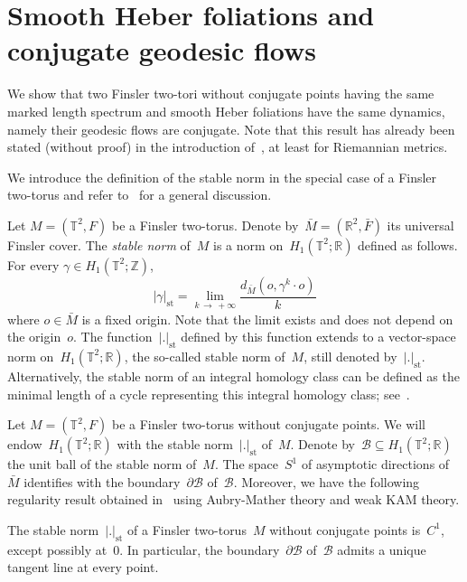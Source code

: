 \documentclass[AHL,Unicode,longabstracts,published]{cedram}
\newcommand{\B}{\mathcal{B}}
\newcommand{\Z}{\mathbb{Z}}
\newcommand{\R}{\mathbb{R}}
\newcommand{\T}{\mathbb{T}}
\newcommand{\rst}{\mathrm{st}}
\begin{document}
\section{Smooth Heber foliations and conjugate geodesic flows} \label{sec:smoothfoliation}

We show that two Finsler two-tori without conjugate points having the same marked length spectrum and smooth Heber foliations have the same dynamics, namely their geodesic flows are conjugate. Note that this result has already been stated (without proof) in the introduction of~\cite{CK95}, at least for Riemannian metrics. 

We introduce the definition of the stable norm in the special case of a Finsler two-torus and refer to~\cite{gro99} for a general discussion.

\begin{defi}
Let $M=(\T^2,F)$ be a Finsler two-torus. Denote by~$\bar{M}=(\R^2,\bar{F})$ its universal Finsler cover. The \emph{stable norm} of~$M$ is a norm on~$H_1(\T^2;\R)$ defined as follows. For every $\gamma \in H_1(\T^2;\Z)$,
\[
|\gamma|_{\rst} = \lim_{k\,\to\,+\infty} \frac{d_{\bar{M}}\left(o,\gamma^k \cdot o\right)}{k}
\]
where $o \in \bar{M}$ is a fixed origin. Note that the limit exists and does not depend on the origin~$o$. The function~$|.|_{\rst}$ defined by this function extends to a vector-space norm on~$H_1(\T^2;\R)$, the so-called stable norm of~$M$, still denoted by~$|.|_{\rst}$. Alternatively, the stable norm of an integral homology class can be defined as the minimal length of a cycle representing this integral homology class; see~\cite[Lemma~4.32]{gro99}.
\end{defi}


Let $M=(\T^2,F)$ be a Finsler two-torus without conjugate points. We will endow~$H_1(\T^2;\R)$ with the stable norm~$|.|_{\rst}$ of~$M$. Denote by~$\B \subseteq H_1(\T^2;\R)$ the unit ball of the stable norm of~$M$. The space~$S^1$ of asymptotic directions of~$\bar{M}$ identifies with the boundary~$\partial \B$ of~$\B$. Moreover, we have the following regularity result obtained in~\cite[Lemma~5]{MS11} using Aubry-Mather theory and weak KAM theory.

\begin{lemm}
The stable norm~$|.|_{\rst}$ of a Finsler two-torus~$M$ without conjugate points is~$C^1$, except possibly at~$0$. In particular, the boundary~$\partial \B$ of~$\B$ admits a unique tangent line at every point.
\end{lemm}
\end{document}
